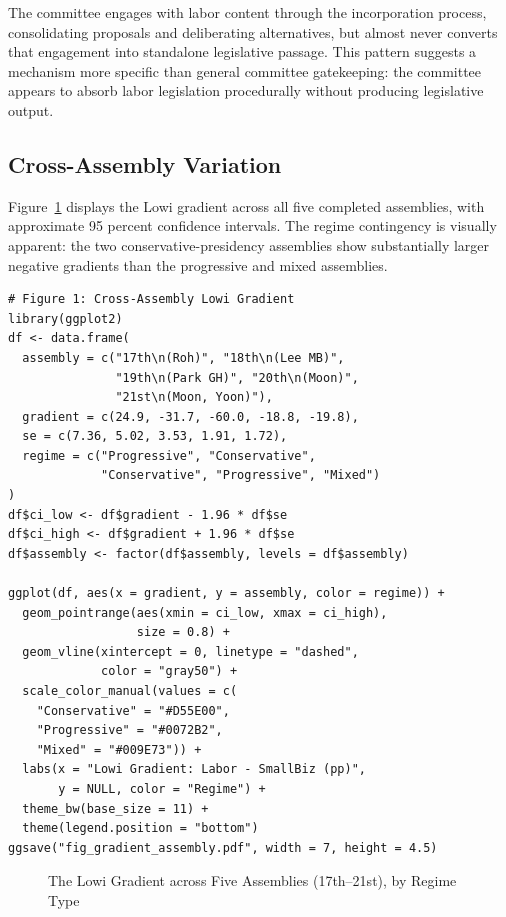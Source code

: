 \documentclass[11pt]{article}
\begin{document}
\noindent The committee engages with labor content through the incorporation process, consolidating proposals and deliberating alternatives, but almost never converts that engagement into standalone legislative passage. This pattern suggests a mechanism more specific than general committee gatekeeping: the committee appears to absorb labor legislation procedurally without producing legislative output.

\subsection{Cross-Assembly Variation}

Figure~\ref{fig:gradient} displays the Lowi gradient across all five completed assemblies, with approximate 95 percent confidence intervals. The regime contingency is visually apparent: the two conservative-presidency assemblies show substantially larger negative gradients than the progressive and mixed assemblies.

\begin{verbatim}
# Figure 1: Cross-Assembly Lowi Gradient
library(ggplot2)
df <- data.frame(
  assembly = c("17th\n(Roh)", "18th\n(Lee MB)",
               "19th\n(Park GH)", "20th\n(Moon)",
               "21st\n(Moon, Yoon)"),
  gradient = c(24.9, -31.7, -60.0, -18.8, -19.8),
  se = c(7.36, 5.02, 3.53, 1.91, 1.72),
  regime = c("Progressive", "Conservative",
             "Conservative", "Progressive", "Mixed")
)
df$ci_low <- df$gradient - 1.96 * df$se
df$ci_high <- df$gradient + 1.96 * df$se
df$assembly <- factor(df$assembly, levels = df$assembly)

ggplot(df, aes(x = gradient, y = assembly, color = regime)) +
  geom_pointrange(aes(xmin = ci_low, xmax = ci_high),
                  size = 0.8) +
  geom_vline(xintercept = 0, linetype = "dashed",
             color = "gray50") +
  scale_color_manual(values = c(
    "Conservative" = "#D55E00",
    "Progressive" = "#0072B2",
    "Mixed" = "#009E73")) +
  labs(x = "Lowi Gradient: Labor - SmallBiz (pp)",
       y = NULL, color = "Regime") +
  theme_bw(base_size = 11) +
  theme(legend.position = "bottom")
ggsave("fig_gradient_assembly.pdf", width = 7, height = 4.5)
\end{verbatim}

\begin{figure}[H]
\centering
{}
\caption{The Lowi Gradient across Five Assemblies (17th--21st), by Regime Type}
\label{fig:gradient}
\end{figure}
\end{document}
